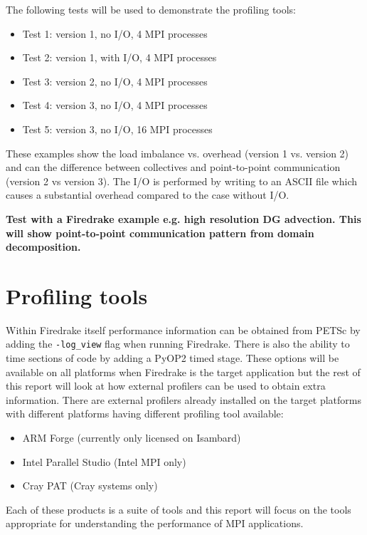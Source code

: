 \documentclass[a4paper,titlepage]{article}
\begin{document}
The following tests will be used to demonstrate the profiling tools:
\begin{itemize}
\item Test 1: version 1, no I/O, 4 MPI processes
\item Test 2: version 1, with I/O, 4 MPI processes
\item Test 3: version 2, no I/O, 4 MPI processes
\item Test 4: version 3, no I/O, 4 MPI processes
\item Test 5: version 3, no I/O, 16 MPI processes 
\end{itemize}
These examples show the load imbalance vs. overhead (version 1 vs. version 2) and can the difference between collectives and point-to-point communication (version 2 vs version 3). The I/O is performed by writing to an ASCII file which causes a substantial overhead compared to the case without I/O.

\textbf{Test with a Firedrake example e.g. high resolution DG advection. This will show point-to-point communication pattern from domain decomposition.}



\section{Profiling tools}

Within Firedrake itself performance information can be obtained from PETSc by adding the \verb+-log_view+ flag when running Firedrake. There is also the ability to time sections of code by adding a PyOP2 timed stage. These options will be available on all platforms when Firedrake is the target application but the rest of this report will look at how external profilers can be used to obtain extra information. There are external profilers already installed on the target platforms with different platforms having different profiling tool available:
%
\begin{itemize}
\item ARM Forge (currently only licensed on Isambard)
\item Intel Parallel Studio (Intel MPI only)
\item Cray PAT (Cray systems only)
\end{itemize}
%
Each of these products is a suite of tools and this report will focus on the tools appropriate for understanding the performance of MPI applications.
\end{document}
